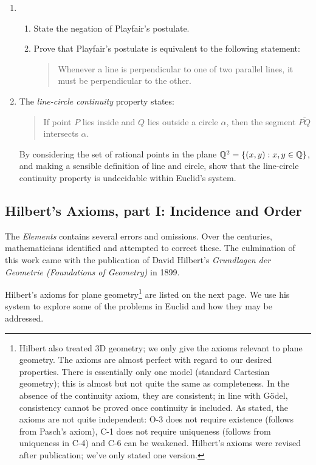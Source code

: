\begin{exercises}
\begin{enumerate}
	  
	  \item\begin{enumerate}
	    \item State the negation of Playfair's postulate.
	    \item Prove that Playfair's postulate is equivalent to the following statement:
	  \begin{quote}
	  	Whenever a line is perpendicular to one of two parallel lines, it must be perpendicular to the other.
	  \end{quote}
	  \end{enumerate}
	 
	  
	  \item\label{ex:euclidundecideable} The \emph{line-circle continuity} property states:
	  \begin{quote}
	  If point $P$ lies inside and $Q$ lies outside a circle $\alpha$, then the segment $\overline{PQ}$ intersects $\alpha$.
	  \end{quote}
	  By considering the set of rational points in the plane $\mathbb{Q}^2=\{(x,y):x,y\in\mathbb{Q}\}$, and making a sensible definition of line and circle, show that the line-circle continuity property is undecidable within Euclid's system.
	\end{enumerate}
	
\end{exercises}

\clearpage



\subsection{Hilbert's Axioms, part I: Incidence and Order}\label{sec:hilbert1}

The \emph{Elements} contains several errors and omissions. Over the centuries, mathematicians identified and attempted to correct these. The culmination of this work came with the publication of David Hilbert's \emph{Grundlagen der Geometrie (Foundations of Geometry)} in 1899.\smallbreak


Hilbert's axioms for plane geometry\footnote{Hilbert also treated 3D geometry; we only give the axioms relevant to plane geometry. The axioms are almost perfect with regard to our desired properties. There is essentially only one model (standard Cartesian geometry); this is almost but not quite the same as completeness. In the absence of the continuity axiom, they are consistent; in line with Gödel, consistency cannot be proved once continuity is included. As stated, the axioms are not quite independent: O-3 does not require existence (follows from Pasch's axiom), C-1 does not require uniqueness (follows from uniqueness in C-4) and C-6 can be weakened. Hilbert's axioms were revised after publication; we've only stated one version.} are listed on the next page. We use his system to explore some of the problems in Euclid and how they may be addressed.\smallbreak


